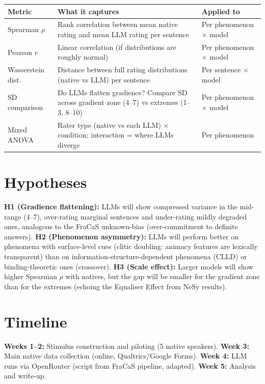 \documentclass[11pt,a4paper]{article}
\begin{document}
\begin{table}[h!]
\centering
\small
\begin{tabularx}{\textwidth}{l X l}
\toprule
\textbf{Metric} & \textbf{What it captures} & \textbf{Applied to} \\
\midrule
Spearman $\rho$ & Rank correlation between mean native rating and mean LLM rating per sentence & Per phenomenon $\times$ model \\
Pearson $r$ & Linear correlation (if distributions are roughly normal) & Per phenomenon $\times$ model \\
Wasserstein dist. & Distance between full rating distributions (native vs LLM) per sentence & Per sentence $\times$ model \\
SD comparison & Do LLMs flatten gradience? Compare SD across gradient zone (4--7) vs extremes (1--3, 8--10) & Per phenomenon $\times$ model \\
Mixed ANOVA & Rater type (native vs each LLM) $\times$ condition; interaction = where LLMs diverge & Per phenomenon \\
\bottomrule
\end{tabularx}
\end{table}

\section{Hypotheses}

\textbf{H1 (Gradience flattening):} LLMs will show compressed variance in the mid-range (4--7), over-rating marginal sentences and under-rating mildly degraded ones, analogous to the FraCaS unknown-bias (over-commitment to definite answers). \textbf{H2 (Phenomenon asymmetry):} LLMs will perform better on phenomena with surface-level cues (clitic doubling: animacy features are lexically transparent) than on information-structure-dependent phenomena (CLLD) or binding-theoretic ones (crossover). \textbf{H3 (Scale effect):} Larger models will show higher Spearman $\rho$ with natives, but the gap will be smaller for the gradient zone than for the extremes (echoing the Equaliser Effect from NeSy results).

\section{Timeline}

\textbf{Weeks 1--2:} Stimulus construction and piloting (5 native speakers). \textbf{Week 3:} Main native data collection (online, Qualtrics/Google Forms). \textbf{Week 4:} LLM runs via OpenRouter (script from FraCaS pipeline, adapted). \textbf{Week 5:} Analysis and write-up.
\end{document}
